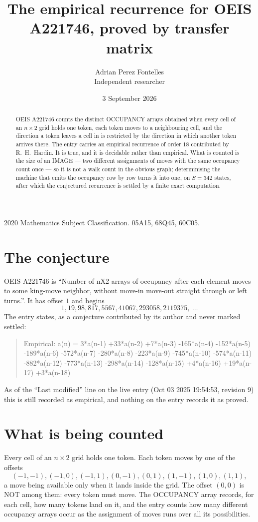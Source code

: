 \documentclass[11pt,a4paper]{article}
\title{The empirical recurrence for OEIS A221746, proved by transfer matrix}
\author{Adrian Perez Fontelles\\ \small Independent researcher}
\date{3 September 2026}
\theoremstyle{plain}
\theoremstyle{definition}
\begin{document}
\maketitle

\begin{abstract}
OEIS A221746 counts the distinct OCCUPANCY arrays obtained when every cell of an $n\times2$ grid
holds one token, each token moves to a neighbouring cell, and the direction a token leaves a
cell in is restricted by the direction in which another token arrives there. The entry carries
an empirical recurrence of order $18$ contributed by R.~H.~Hardin. It is true, and it is
decidable rather than empirical. What is counted is the size of an IMAGE --- two different
assignments of moves with the same occupancy count once --- so it is not a walk count in the
obvious graph; determinising the machine that emits the occupancy row by row turns it into
one, on $S=342$ states, after which the conjectured recurrence is settled by a finite exact
computation.
\end{abstract}

\noindent\small 2020 Mathematics Subject Classification. 05A15, 68Q45, 60C05.\normalsize

\section{The conjecture}

OEIS A221746 is ``Number of nX2 arrays of occupancy after each element moves to some king-move neighbor, without move-in move-out straight through or left turns.''. It has offset $1$ and begins
\[
1, 19, 98, 817, 5567, 41067, 293058, 2119375,\ \dots
\]
The entry states, as a conjecture contributed by its author and never marked settled:
\begin{quote}
Empirical: a(n) = 3*a(n-1) +33*a(n-2) +7*a(n-3) -165*a(n-4) -152*a(n-5) -189*a(n-6) -572*a(n-7) -280*a(n-8) -223*a(n-9) -745*a(n-10) -574*a(n-11) -882*a(n-12) -773*a(n-13) -298*a(n-14) -128*a(n-15) +4*a(n-16) +19*a(n-17) +3*a(n-18)
\end{quote}
As of the ``Last modified'' line on the live entry (Oct 03 2025 19:54:53, revision 9) this is still
recorded as empirical, and nothing on the entry records it as proved.

\section{What is being counted}

Every cell of an $n\times2$ grid holds one token. Each token moves by one of the offsets
\[
(-1,-1), (-1,0), (-1,1), (0,-1), (0,1), (1,-1), (1,0), (1,1),
\]
a move being available only when it lands inside the grid. The offset $(0,0)$ is NOT among them: every token must move. The OCCUPANCY array
records, for each cell, how many tokens land on it, and the entry counts how many different
occupancy arrays occur as the assignment of moves runs over all its possibilities.
\end{document}
